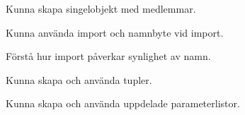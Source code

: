 
\item Kunna skapa singelobjekt med medlemmar.
\item Kunna använda import och namnbyte vid import.
\item Förstå hur import påverkar synlighet av namn.
\item Kunna skapa och använda tupler.
\item Kunna skapa och använda uppdelade parameterlistor.
